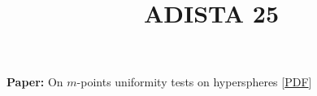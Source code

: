 \title{ADISTA 25}

\textbf{Paper:} On $m$-points uniformity tests on hyperspheres [\href{/m_points.pdf}{PDF}]

